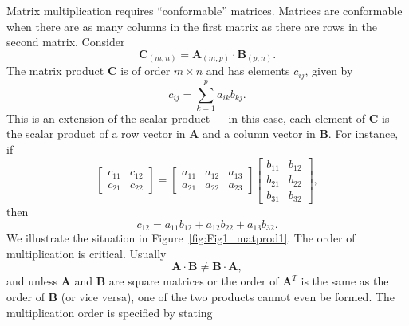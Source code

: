 Matrix multiplication requires ``conformable'' matrices. Matrices are conformable when 
there are as many columns in the first matrix as there are rows in the second matrix.  Consider
\begin{equation}
\mathbf{C}_{(m,n)} = \mathbf{A}_{(m,p)} \cdot \mathbf{B}_{(p,n)}.
\end{equation}	 
The matrix product $\mathbf{C}$ is of order $m \times n$ and has elements $c_{ij}$, given by
\begin{equation}
c_{ij} = \sum^p _{k=1} a_{ik}b_{kj}.
\end{equation}	 
This is an extension of the scalar product --- in this case, each element of $\mathbf{C}$ is the scalar product of a row 
vector in $\mathbf{A}$ and a column vector in $\mathbf{B}$.  For instance, if
\begin{equation}
\left[
\begin{array}{cc}
c_{11} & c_{12} \\
c_{21} & c_{22} 
\end{array}
\right ]
=
\left[
\begin{array}{ccc}
a_{11}&  a_{12} &  a_{13}\\
a_{21}&  a_{22} &  a_{23}
\end{array}
\right ]
\left [
\begin{array}{cc}
b_{11} & b_{12}\\
b_{21} & b_{22}\\
b_{31} & b_{32}
\end{array}
\right],
\end{equation}
then
\begin{equation}
c_{12} = a_{11}b_{12} + a_{12}b_{22} + a_{13}b_{32}.
\end{equation}
We illustrate the situation in Figure~\ref{fig:Fig1_matprod1}.
The order of multiplication is critical. Usually
\begin{equation}
\mathbf{A \cdot B \neq B \cdot A},
\end{equation}	 
and unless $\mathbf{A}$ and $\mathbf{B}$ are square matrices or the order of $\mathbf{A}^T$ is the same as the order of $\mathbf{B}$ (or vice 
versa), one of the two products cannot even be formed. The multiplication order is specified by stating

